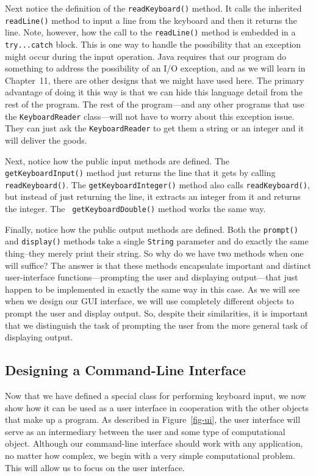 Next notice the definition of the {\tt readKeyboard()} method.  It
calls the inherited {\tt readLine()} method to input a line from the
keyboard and then it returns the line. Note, however, how the call to
the {\tt readLine()} method is embedded in a {\tt try...catch} block.
This is one way to handle the possibility that an exception might
occur during the input operation. Java requires that our program do
something to address the possibility of an I/O exception, and as we
will learn in Chapter~11, there are other designs that we might have
used here.  The primary advantage of doing it this way is that we can
hide this language detail from the rest of the program.  The rest of
the program---and any other programs that use the {\tt KeyboardReader}
class---will not have to worry about this exception issue. They can
just ask the {\tt KeyboardReader} to get them a string or an integer
and it will deliver the goods.

Next, notice how the public input methods are defined. The {\tt
getKeyboardInput()} method just returns the line that it gets by
calling {\tt readKeyboard()}.  The {\tt getKeyboardInteger()} method
also calls {\tt readKeyboard()}, but instead of just returning the
line, it extracts an integer from it and returns the integer. The {\tt
getKeyboardDouble()} method works the same way.

Finally, notice how the public output methods are defined. Both the
{\tt prompt()} and {\tt display()} methods take a single {\tt String}
parameter and do exactly the same thing--they merely print their
string. So why do we have two methods when one will suffice?  The
answer is that these methods encapsulate important and distinct
user-interface functions---prompting the user and displaying
output---that just happen to be implemented in exactly the same way in
this case. As we will see when we design our GUI interface, we will
use completely different objects to prompt the user and display
output. So, despite their similarities, it is important that we
distinguish the task of prompting the user from the more general task
of displaying output.

\subsection{Designing a Command-Line Interface}

Now that we have defined a special class for performing keyboard
input, we now show how it can be used as a user interface in
cooperation with the other objects that make up a program.  As
described in Figure~\ref{fig-ui}, the user interface will serve as an
intermediary between the user and some type of computational object.
Although our command-line interface should work with any application,
no matter how complex, we begin with a very simple computational
problem.  This will allow us to focus on the user interface.  

